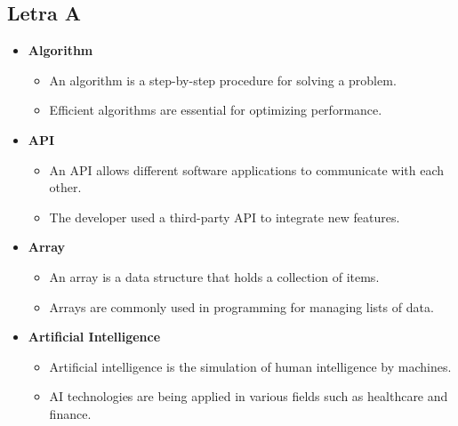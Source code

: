     \subsection{Letra A}
    \begin{itemize}
        \item \textbf{Algorithm}
        \begin{itemize}
            \item An algorithm is a step-by-step procedure for solving a problem.
            \item Efficient algorithms are essential for optimizing performance.
        \end{itemize}
        \item \textbf{API}
        \begin{itemize}
            \item An API allows different software applications to communicate with each other.
            \item The developer used a third-party API to integrate new features.
        \end{itemize}
        \item \textbf{Array}
        \begin{itemize}
            \item An array is a data structure that holds a collection of items.
            \item Arrays are commonly used in programming for managing lists of data.
        \end{itemize}
        \item \textbf{Artificial Intelligence}
        \begin{itemize}
            \item Artificial intelligence is the simulation of human intelligence by machines.
            \item AI technologies are being applied in various fields such as healthcare and finance.
        \end{itemize}
    \end{itemize}

